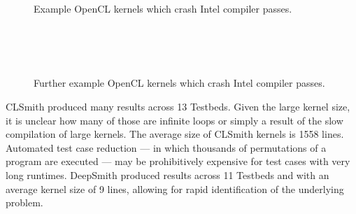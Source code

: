 
\begin{figure}
  \centering
  \\%
  \\%
  \\%
  \\%
  \\%
  \caption[Example kernels which crash Intel compiler passes]{%
    Example OpenCL kernels which crash Intel compiler passes.%
  }%
  \label{lst:intel-passes}
\end{figure}


\begin{figure}
	\centering
	\\%
	\\%
	\\%
	\caption[Further example kernels which crash Intel compiler passes]{%
    Further example OpenCL kernels which crash Intel compiler passes.%
	}%
	\label{lst:further-intel-passes}
\end{figure}

CLSmith produced many \bto results across 13 Testbeds. Given the large kernel size, it is unclear how many of those are infinite loops or simply a result of the slow compilation of large kernels. The average size of CLSmith \bto kernels is 1558 lines. Automated test case reduction --- in which thousands of permutations of a program are executed --- may be prohibitively expensive for test cases with very long runtimes. DeepSmith produced \bto results across 11 Testbeds and with an average kernel size of 9 lines, allowing for rapid identification of the underlying problem.

